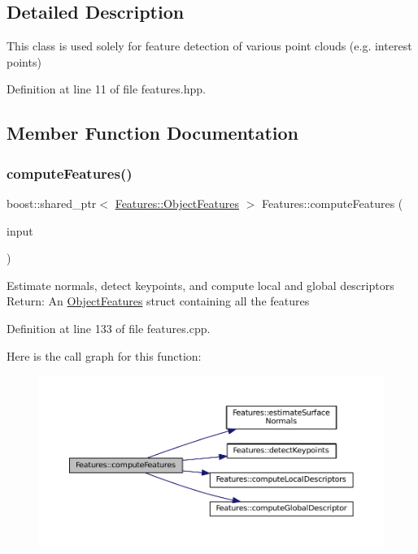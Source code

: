 \subsection{Detailed Description}
This class is used solely for feature detection of various point clouds (e.\+g. interest points) 

Definition at line 11 of file features.\+hpp.



\subsection{Member Function Documentation}
\hypertarget{class_features_ad1d4524155b37393ae8b64f0c5c0d553}{}\label{class_features_ad1d4524155b37393ae8b64f0c5c0d553} 
\subsubsection{\texorpdfstring{compute\+Features()}{computeFeatures()}}
{\footnotesize\ttfamily boost\+::shared\+\_\+ptr$<$ \hyperlink{struct_features_1_1_object_features}{Features\+::\+Object\+Features} $>$ Features\+::compute\+Features (\begin{DoxyParamCaption}\item[{const pcl\+::\+Point\+Cloud$<$ pcl\+::\+Point\+X\+Y\+Z\+R\+GB $>$\+::Ptr \&}]{input }\end{DoxyParamCaption})}

Estimate normals, detect keypoints, and compute local and global descriptors Return\+: An \hyperlink{struct_features_1_1_object_features}{Object\+Features} struct containing all the features 

Definition at line 133 of file features.\+cpp.

Here is the call graph for this function\+:
\nopagebreak
\begin{figure}[H]
\begin{center}
\leavevmode
\includegraphics[width=350pt]{class_features_ad1d4524155b37393ae8b64f0c5c0d553_cgraph}
\end{center}
\end{figure}
\hypertarget{class_features_a6e7efba994adbfa03682e796ed932a99}{}\label{class_features_a6e7efba994adbfa03682e796ed932a99} 
